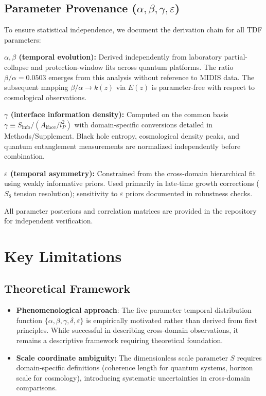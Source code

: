 \subsection{Parameter Provenance ($\alpha, \beta, \gamma, \varepsilon$)}

To ensure statistical independence, we document the derivation chain for all TDF parameters:

\textbf{$\alpha, \beta$ (temporal evolution):} Derived independently from laboratory partial-collapse and protection-window fits across quantum platforms. The ratio $\beta/\alpha = 0.0503$ emerges from this analysis without reference to MIDIS data. The subsequent mapping $\beta/\alpha \to k(z)$ via $E(z)$ is parameter-free with respect to cosmological observations.

\textbf{$\gamma$ (interface information density):} Computed on the common basis $\gamma \equiv S_{\text{info}}/(A_{\text{iface}}/l_P^2)$ with domain-specific conversions detailed in Methods/Supplement. Black hole entropy, cosmological density peaks, and quantum entanglement measurements are normalized independently before combination.

\textbf{$\varepsilon$ (temporal asymmetry):} Constrained from the cross-domain hierarchical fit using weakly informative priors. Used primarily in late-time growth corrections ($S_8$ tension resolution); sensitivity to $\varepsilon$ priors documented in robustness checks.

All parameter posteriors and correlation matrices are provided in the repository for independent verification.

\section{Key Limitations}

\subsection{Theoretical Framework}
\begin{itemize}
\item \textbf{Phenomenological approach}: The five-parameter temporal distribution function $\{\alpha, \beta, \gamma, \delta, \varepsilon\}$ is empirically motivated rather than derived from first principles. While successful in describing cross-domain observations, it remains a descriptive framework requiring theoretical foundation.
\item \textbf{Scale coordinate ambiguity}: The dimensionless scale parameter $S$ requires domain-specific definitions (coherence length for quantum systems, horizon scale for cosmology), introducing systematic uncertainties in cross-domain comparisons.
\end{itemize}

